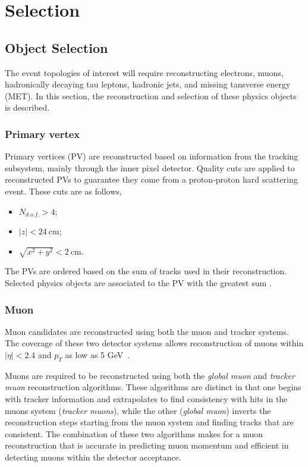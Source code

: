 \section{Selection}
\label{sec:analysis:selection}



\subsection{Object Selection}
The event topologies of interest will require reconstructing electrons, muons, hadronically decaying tau leptons, hadronic jets, and missing tansverse energy (MET).  In this section, the reconstruction and selection of these physics objects is described.



\subsubsection{Primary vertex}
Primary vertices (PV) are reconstructed based on information from the tracking subsystem, mainly through the inner pixel detector. Quality cuts are applied to reconstructed PVs to guarantee they come from a proton-proton hard scattering event. These cuts are as follows,
\begin{itemize}
    \item $N_{d.o.f.}> 4$;
    \item $\left|z\right| < 24~\mathrm{cm}$; 
    \item $\sqrt{x^{2} + y^{2}} < 2~\mathrm{cm}$.
\end{itemize}
The PVs are ordered based on the sum \pt of tracks used in their reconstruction.  Selected physics objects are associated to the PV with the greatest sum \pt. 




\subsubsection{Muon}
Muon candidates are reconstructed using both the muon and tracker systems. The coverage of these two detector systems allows reconstruction of muons within $\left|\eta\right| < 2.4$ and $p_{T}$ as low as 5 GeV~\cite{Chatrchyan:2012xi}. 

Muons are required to be reconstructed using both the \emph{global muon} and \emph{tracker muon} reconstruction algorithms.  These algorithms are distinct in that one begins with tracker information and extrapolates to find consistency with hits in the muons system (\emph{tracker muons}), while the other (\emph{global muon}) inverts the reconstruction steps starting from the muon system and finding tracks that are consistent. The combination of these two algorithms makes for a muon reconstruction that is accurate in predicting muon momentum and efficient in detecting muons within the detector acceptance.

